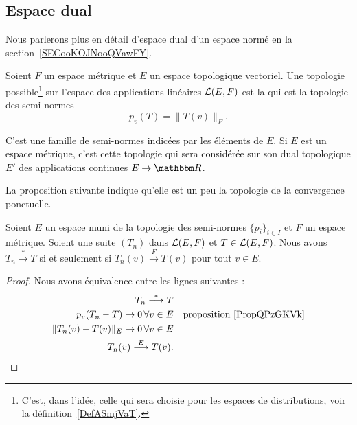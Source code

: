 \subsection{Espace dual}

Nous parlerons plus en détail d'espace dual d'un espace normé en la section~\ref{SECooKOJNooQVawFY}.

\begin{definition}  \label{DefHUelCDD}
    Soient \( F\) un espace métrique et \( E\) un espace topologique vectoriel. Une topologie possible\footnote{C'est, dans l'idée, celle qui sera choisie pour les espaces de distributions, voir la définition~\ref{DefASmjVaT}.} sur l'espace des applications linéaires \( \mathcal{L}(E,F)\) est la  qui est la topologie des semi-normes
    \begin{equation}
        p_v(T)=\| T(v) \|_F.
    \end{equation}
\end{definition}
C'est une famille de semi-normes indicées par les éléments de \( E\). Si \( E\) est un espace métrique, c'est cette topologie qui sera considérée sur son dual topologique \( E'\) des applications continues \( E\to \eR\).

La proposition suivante indique qu'elle est un peu la topologie de la convergence ponctuelle.
\begin{proposition}
    Soient \( E\) un espace muni de la topologie des semi-normes \( \{ p_i \}_{i\in I}\) et \( F\) un espace métrique. Soient une suite \( (T_n)\) dans \( \mathcal{L}(E,F)\) et \( T\in \mathcal{L}(E,F)\). Nous avons \( T_n\stackrel{*}{\longrightarrow}T\) si et seulement si \( T_n(v)\stackrel{F}{\longrightarrow}T(v)\) pour tout \( v\in E\).
\end{proposition}

\begin{proof}
    Nous avons équivalence entre les lignes suivantes :
    \begin{subequations}
        \begin{align}
            T_n\stackrel{*}{\longrightarrow}T\\
            p_v(T_n-T)\to 0\,\forall v\in E &&\text{proposition~\ref{PropQPzGKVk}}\\
            \| T_n(v)-T(v) \|_E\to 0\,\forall v\in E\\
            T_n(v)\stackrel{E}{\longrightarrow}T(v).
        \end{align}
    \end{subequations}
\end{proof}

